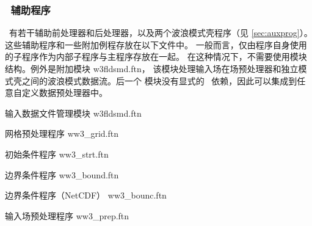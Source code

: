 \vsssub
\subsubsection{~辅助程序} \label{sec:aux_mod}
\vsssub

\vspace{\baselineskip}
\noindent
\ww\ 有若干辅助前处理器和后处理器，以及两个波浪模式壳程序（见
\para\ref{sec:auxprog}）。这些辅助程序和一些附加例程存放在以下文件中。
一般而言，仅由程序自身使用的子程序作为内部子程序与主程序存放在一起。
在这种情况下，不需要使用模块结构。例外是附加模块 {\file w3fldsmd.ftn}，
该模块处理输入场在场预处理器和独立模式壳之间的波浪模式数据流。后一个
模块没有显式的 \ws\ 依赖，因此可以集成到任意自定义数据预处理器中。


% 

\vspace{\baselineskip} 
\noindent
输入数据文件管理模块 \hfill {\file w3fldsmd.ftn}

\begin{flisti}
\end{flisti}

\noindent
网格预处理程序 \hfill {\file ww3\_grid.ftn}

\begin{flisti}
\end{flisti}

\noindent
初始条件程序 \hfill {\file ww3\_strt.ftn}

\begin{flisti}
\end{flisti}

\noindent
边界条件程序 \hfill {\file ww3\_bound.ftn}

\noindent
边界条件程序（NetCDF） \hfill {\file ww3\_bounc.ftn}

\begin{flisti}
\end{flisti}

\noindent
输入场预处理程序 \hfill {\file ww3\_prep.ftn}

